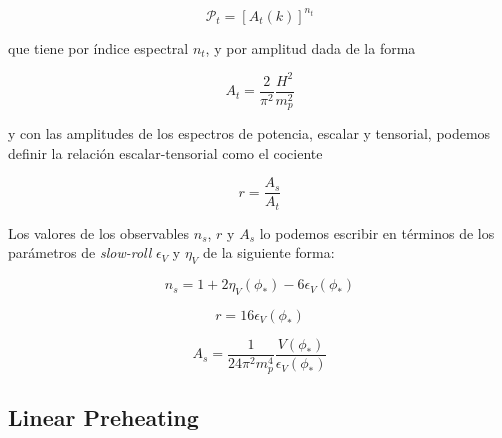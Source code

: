 \begin{equation}
    \mathcal{P}_{t} = \left[ A_t (k) \right]^{n_t}
\end{equation}

\noindent
que tiene por índice espectral $n_t$, y por amplitud dada de la forma

\begin{equation}
    A_t = \frac{2}{\pi^2} \frac{H^2}{m_p^2}
\end{equation}

\noindent
y con las amplitudes de los espectros de potencia, escalar y tensorial, podemos definir la relación escalar-tensorial como el cociente

\begin{equation}
    r = \frac{A_s}{A_t}
\end{equation}

Los valores de los observables $n_s$, $r$ y $A_s$ lo podemos escribir en términos de los parámetros de \textit{slow-roll} $\epsilon_V$ y $\eta_V$ de la siguiente forma:

\begin{equation}
    n_s = 1 + 2 \eta_V (\phi_*) - 6 \epsilon_V (\phi_*)
\end{equation}

\begin{equation}
    r = 16 \epsilon_V (\phi_*)
\end{equation}

\begin{equation}
    A_s = \frac{1}{24 \pi^2 m_p^4} \frac{V(\phi_*)}{\epsilon_V (\phi_*)}
\end{equation}

\subsection{Linear Preheating}